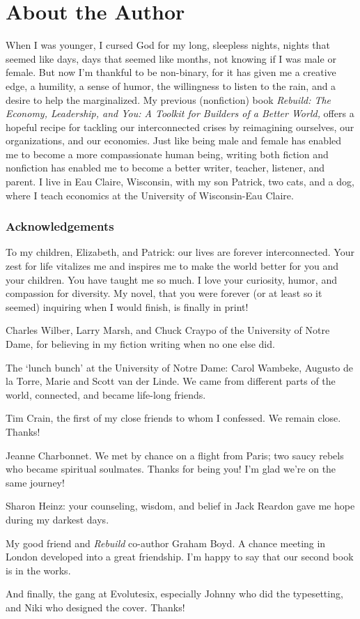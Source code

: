 \chapter*{About the Author}

When I was younger, I cursed God for my long, sleepless nights, nights
that seemed like days, days that seemed like months, not knowing if I
was male or female. But now I'm thankful to be non-binary, for it has
given me a creative edge, a humility, a sense of humor, the willingness
to listen to the rain, and a desire to help the marginalized. My
previous (nonfiction) book \emph{Rebuild: The Economy, Leadership, and
You: A Toolkit for Builders of a Better World,} offers a hopeful recipe
for tackling our interconnected crises by reimagining ourselves, our
organizations, and our economies. Just like being male and female has
enabled me to become a more compassionate human being, writing both
fiction and nonfiction has enabled me to become a better writer,
teacher, listener, and parent. I live in Eau Claire, Wisconsin, with my
son Patrick, two cats, and a dog, where I teach economics at the
University of Wisconsin-Eau Claire.

\subsection*{Acknowledgements}

To my children, Elizabeth, and Patrick: our lives are forever
interconnected. Your zest for life vitalizes me and inspires me to make
the world better for you and your children. You have taught me so much.
I love your curiosity, humor, and compassion for diversity. My novel,
that you were forever (or at least so it seemed) inquiring when I would
finish, is finally in print!

Charles Wilber, Larry Marsh, and Chuck Craypo of the University of Notre
Dame, for believing in my fiction writing when no one else did.

The `lunch bunch' at the University of Notre Dame: Carol Wambeke,
Augusto de la Torre, Marie and Scott van der Linde. We came from
different parts of the world, connected, and became life-long friends.

Tim Crain, the first of my close friends to whom I confessed. We remain
close. Thanks!

Jeanne Charbonnet. We met by chance on a flight from Paris; two saucy
rebels who became spiritual soulmates. Thanks for being you! I'm glad
we're on the same journey!

Sharon Heinz: your counseling, wisdom, and belief in Jack Reardon gave
me hope during my darkest days.

My good friend and \emph{Rebuild} co-author Graham Boyd. A chance
meeting in London developed into a great friendship. I'm happy to say
that our second book is in the works.

And finally, the gang at Evolutesix, especially Johnny who did the
typesetting, and Niki who designed the cover. Thanks!
